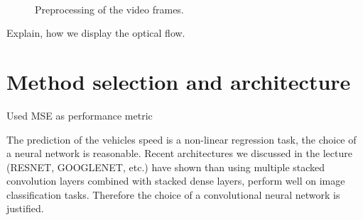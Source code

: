 \documentclass[conference]{IEEEtran}
\begin{document}
\begin{figure}
\centering
   \hspace{0.1cm}
  \\
  \label{figur}\caption{Preprocessing of the video frames.}
\end{figure}

Explain, how we display the optical flow.

\section{Method selection and architecture}
Used MSE as performance metric

The prediction of the vehicles speed is a non-linear regression task, the choice of a neural network is reasonable. Recent 
architectures we discussed in the lecture (RESNET, GOOGLENET, etc.) have shown than using multiple stacked convolution layers
combined with stacked dense layers, perform well on image classification tasks. Therefore the choice of a convolutional neural network
is justified.
\end{document}
